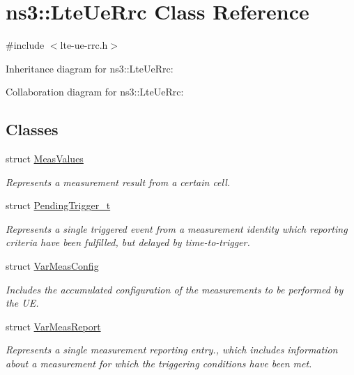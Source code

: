 \hypertarget{classns3_1_1LteUeRrc}{}\section{ns3\+:\+:Lte\+Ue\+Rrc Class Reference}
\label{classns3_1_1LteUeRrc}


{\ttfamily \#include $<$lte-\/ue-\/rrc.\+h$>$}



Inheritance diagram for ns3\+:\+:Lte\+Ue\+Rrc\+:


Collaboration diagram for ns3\+:\+:Lte\+Ue\+Rrc\+:
\subsection*{Classes}
\begin{DoxyCompactItemize}
\item 
struct \hyperlink{structns3_1_1LteUeRrc_1_1MeasValues}{Meas\+Values}
\begin{DoxyCompactList}\small\item\em Represents a measurement result from a certain cell. \end{DoxyCompactList}\item 
struct \hyperlink{structns3_1_1LteUeRrc_1_1PendingTrigger__t}{Pending\+Trigger\+\_\+t}
\begin{DoxyCompactList}\small\item\em Represents a single triggered event from a measurement identity which reporting criteria have been fulfilled, but delayed by time-\/to-\/trigger. \end{DoxyCompactList}\item 
struct \hyperlink{structns3_1_1LteUeRrc_1_1VarMeasConfig}{Var\+Meas\+Config}
\begin{DoxyCompactList}\small\item\em Includes the accumulated configuration of the measurements to be performed by the UE. \end{DoxyCompactList}\item 
struct \hyperlink{structns3_1_1LteUeRrc_1_1VarMeasReport}{Var\+Meas\+Report}
\begin{DoxyCompactList}\small\item\em Represents a single measurement reporting entry., which includes information about a measurement for which the triggering conditions have been met. \end{DoxyCompactList}\end{DoxyCompactItemize}
